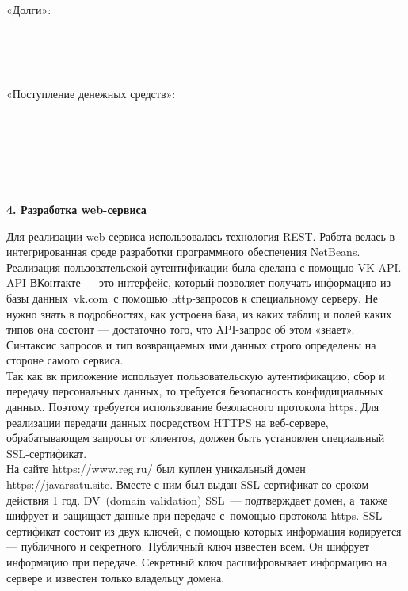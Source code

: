\documentclass[a4paper]{article}
\begin{document}
 
 \normalsize{«Долги»:
}\\
 \begin{itemize}
 \\
 \\
 \\
 \end{itemize}
 
 
  \normalsize{«Поступление денежных средств»:
}\\
 \begin{itemize}
 \\
 \\
 \\
 \\
 \\
 \end{itemize}
 \newpage

\hfill \break
\hfill \break
\begin{center}
\Large{\textbf{4. Разработка web-сервиса
}}\\
\end{center}


\normalsize{Для реализации web-сервиса использовалась технология REST. Работа велась в интегрированная среде разработки программного обеспечения NetBeans.
}\\


\normalsize{Реализация пользовательской аутентификации была сделана с помощью VK API. API ВКонтакте — это интерфейс, который позволяет получать информацию из базы данных vk.com с помощью http-запросов к специальному серверу. Не нужно знать в подробностях, как устроена база, из каких таблиц и полей каких типов она состоит — достаточно того, что API-запрос об этом «знает». Синтаксис запросов и тип возвращаемых ими данных строго определены на стороне самого сервиса. 
}\\


\normalsize{Так как вк приложение использует пользовательскую аутентификацию, сбор и передачу персональных данных, то требуется безопасность конфидициальных данных. Поэтому требуется использование безопасного протокола https. Для реализации передачи данных посредством HTTPS на веб-сервере, обрабатывающем запросы от клиентов, должен быть установлен специальный SSL-сертификат.
}\\


\normalsize{На сайте https://www.reg.ru/ был куплен уникальный домен https://javarsatu.site. Вместе с ним был выдан SSL-сертификат со сроком действия 1 год. DV (domain validation) SSL — подтверждает домен, а также шифрует и защищает данные при передаче с помощью протокола https. 
SSL-сертификат состоит из двух ключей, с помощью которых информация кодируется — публичного и секретного. Публичный ключ известен всем. Он шифрует информацию при передаче. Секретный ключ расшифровывает информацию на сервере и известен только владельцу домена.
}\\
\end{document}
